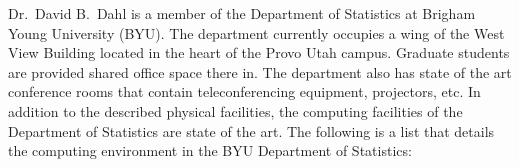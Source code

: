 \documentclass[11pt]{article}
\begin{document}

\vspace{5pt}


\noindent Dr.\ David B.\ Dahl is a member of the Department of Statistics at Brigham Young University (BYU).  The department currently occupies a wing of the West View Building located in the heart of the Provo Utah campus.  Graduate students are provided shared office space there in.  The department also has state of the art conference rooms that contain teleconferencing equipment, projectors, etc.  In addition to the described physical facilities, the computing facilities of the Department of Statistics are state of the art.  The following is a list that details the computing environment in the BYU Department of Statistics:
\end{document}
